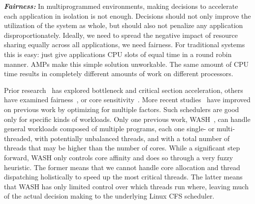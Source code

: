 \textbf{\textit{Fairness:}} In multiprogrammed environments, making decisions to accelerate each application in isolation is not enough. Decisions should not only improve the utilization of the system as whole, but should also not penalize any application disproportionately. Ideally, we need to spread the negative impact of resource sharing equally across all applications, we need fairness. For traditional systems this is easy: just give applications CPU slots of equal time in a round robin manner. AMPs make this simple solution unworkable. The same amount of CPU time results in completely different amounts of work on different processors.




Prior research~\cite{han2018multicore,chronaki2017task,joao2012bottleneck,suleman2009accelerating,du2013criticality} has explored bottleneck and critical section acceleration, others have examined fairness~\cite{zahedi2018amdahl,wang2016rebudget,van2012scheduling,li2009efficient,li2007efficient}, or core sensitivity~\cite{cao2012yin,kumar2004single,becchi2006dynamic}. More recent studies~\cite{kim2018exploring,kim2016fairness,saez2012leveraging,van2013fairness,joao2013utility} have improved on previous work by optimizing for multiple factors.
Such schedulers are good only for specific kinds of workloads. Only one previous work, WASH~\cite{jibaja2016portable}, can handle general workloads composed of multiple programs, each one single- or multi-threaded, with potentially unbalanced threads, and with a total number of threads that may be higher than the number of cores. While a significant step forward, WASH only controls core affinity and does so through a very fuzzy heuristic. The former means that we cannot handle core allocation and thread dispatching holistically to speed up the most critical threads. The latter means that WASH has only limited control over which threads run where, leaving much of the actual decision making to the underlying Linux CFS scheduler.


